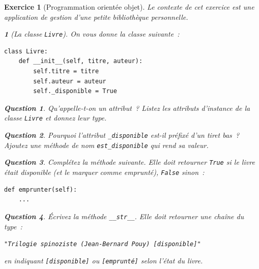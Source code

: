 \documentclass{article}
\theoremstyle{exostyle}
\newtheorem{exo}{Exercice}
\theoremstyle{partiestyle}
\newtheorem{partie}{}[exo]
\theoremstyle{questionstyle}
\newtheorem{questionpartie}{Question}[partie]
\begin{document}
\begin{exo}[Programmation orientée objet]

Le contexte de cet exercice est une application de gestion d'une petite bibliothèque personnelle.

    \begin{partie}[La classe \texttt{Livre}]

On vous donne la classe suivante~:

\begin{lstlisting}
class Livre:
    def __init__(self, titre, auteur):
        self.titre = titre
        self.auteur = auteur
        self._disponible = True
\end{lstlisting}

        \begin{questionpartie}
            Qu'appelle-t-on un \textit{attribut}~? Listez les attributs d'instance de la classe \texttt{Livre} et donnez leur type.
        \end{questionpartie}

        \begin{questionpartie}
            Pourquoi l'attribut \texttt{\_disponible} est-il préfixé d'un tiret bas~? Ajoutez une méthode de nom \texttt{est\_disponible} qui rend sa valeur.
        \end{questionpartie}

        \begin{questionpartie}
            Complétez la méthode suivante. Elle doit retourner \texttt{True} si le livre était disponible (et le marquer comme emprunté), \texttt{False} sinon~:

\begin{lstlisting}
def emprunter(self):
    ...
\end{lstlisting}
        \end{questionpartie}

        \begin{questionpartie}
            Écrivez la méthode \texttt{\_\_str\_\_}. Elle doit retourner une chaîne du type~:
            \begin{center}
                \texttt{"Trilogie spinoziste (Jean-Bernard Pouy) [disponible]"}
            \end{center}
            en indiquant \texttt{[disponible]} ou \texttt{[emprunté]} selon l'état du livre.
        \end{questionpartie}

    \end{partie}


\end{exo}
\end{document}
